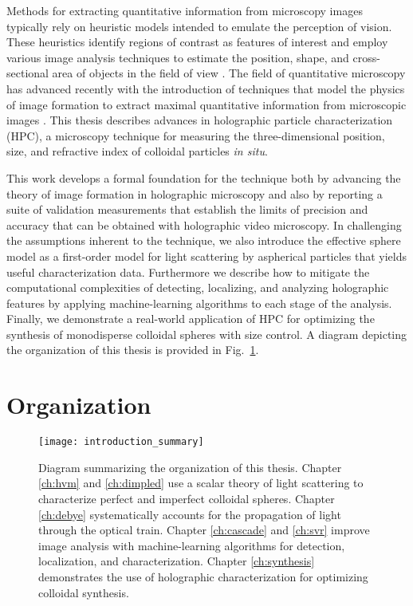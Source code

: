 Methods for extracting quantitative information from microscopy
images typically rely on heuristic models intended to emulate
the perception of vision.
These heuristics identify regions of contrast as features
of interest and employ various image analysis techniques to estimate
the position, shape, and cross-sectional area of objects in the
field of view \cite{jahne97,gonzalez06,castleman96,pratt16,jain89}.
The field of quantitative microscopy has advanced recently with the
introduction of techniques that model the physics of image formation
to extract maximal quantitative information
from microscopic images \cite{lee07,bierbaum2017}.
This thesis describes advances in holographic particle characterization (HPC),
a microscopy technique for measuring
the three-dimensional position, size, and refractive index of
colloidal particles \emph{in situ}.

This work develops a formal foundation for the technique both by
advancing the theory of image formation in holographic microscopy
and also by reporting a suite of validation measurements
that establish the limits of precision and accuracy that can be
obtained with holographic video microscopy. In challenging
the assumptions inherent to the technique, we also introduce the
effective sphere model as a first-order model for
light scattering by aspherical particles that yields useful
characterization data.
Furthermore we describe how to mitigate the computational complexities
of detecting, localizing, and analyzing holographic features by
applying machine-learning algorithms to each stage of the analysis.
Finally, we demonstrate a real-world application
of HPC for optimizing the synthesis of monodisperse
colloidal spheres with size control. A diagram depicting the organization
of this thesis is provided in Fig.~\ref{fig:intro}.



\section{Organization}

\begin{figure}
  \centering
  \texttt{[image: introduction\_summary]}
  \caption{Diagram summarizing the organization of this thesis.
    Chapter \ref{ch:hvm} and \ref{ch:dimpled} use a scalar
    theory of light scattering to characterize perfect and imperfect
    colloidal spheres. Chapter \ref{ch:debye} systematically
    accounts for the propagation of light through the optical
    train. Chapter \ref{ch:cascade} and \ref{ch:svr} improve
    image analysis with machine-learning algorithms for detection, localization,
    and characterization. Chapter \ref{ch:synthesis} demonstrates the use
    of holographic characterization for optimizing colloidal
    synthesis.}
  \label{fig:intro}
\end{figure}

